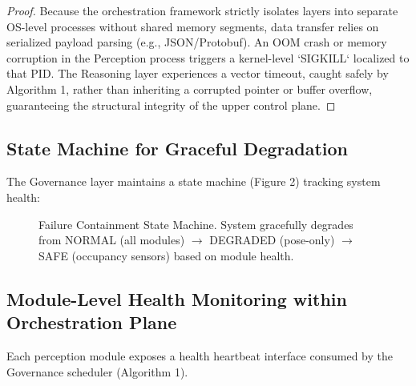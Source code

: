 \documentclass[conference]{IEEEtran}
\begin{document}
\begin{proof}
Because the orchestration framework strictly isolates layers into separate OS-level processes without shared memory segments, data transfer relies on serialized payload parsing (e.g., JSON/Protobuf). An OOM crash or memory corruption in the Perception process triggers a kernel-level `SIGKILL` localized to that PID. The Reasoning layer experiences a vector timeout, caught safely by Algorithm 1, rather than inheriting a corrupted pointer or buffer overflow, guaranteeing the structural integrity of the upper control plane.
\end{proof}

\subsection{State Machine for Graceful Degradation}
The Governance layer maintains a state machine (Figure 2) tracking system health:

\begin{figure}[htbp]
\centering
{}
\caption{Failure Containment State Machine. System gracefully degrades from NORMAL (all modules) $\to$ DEGRADED (pose-only) $\to$ SAFE (occupancy sensors) based on module health.}
\label{fig:fsm}
\end{figure}

\subsection{Module-Level Health Monitoring within Orchestration Plane}
Each perception module exposes a health heartbeat interface consumed by the Governance scheduler (Algorithm 1). 
\end{document}
